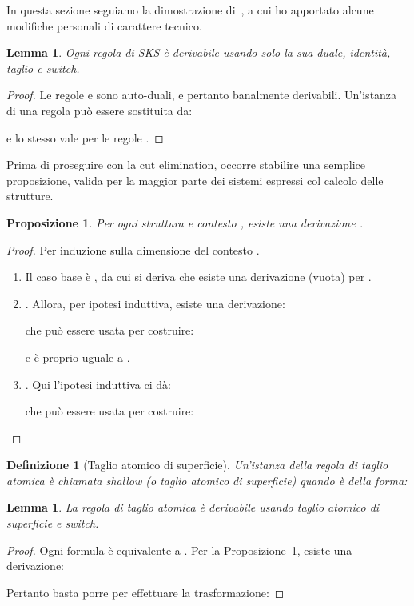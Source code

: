 \documentclass[12pt,a4paper,openright,twoside]{report}
\newtheorem{dfn}[thm]{Definizione}
\newtheorem{lem}[thm]{Lemma}
\newtheorem{prop}[thm]{Proposizione}
\begin{document}
In questa sezione seguiamo la dimostrazione di~\cite{Bru04}, a cui ho apportato alcune modifiche personali di carattere tecnico.

\begin{lem}\label{lem:sks_cut1}
Ogni regola di \textsf{SKS} \`e derivabile usando solo la sua duale, \emph{identit\`a}, \emph{taglio} e \emph{switch}.
\end{lem}
\begin{proof}
Le regole  e  sono auto-duali, e pertanto banalmente derivabili. Un'istanza di una regola  pu\`o essere sostituita da:

e lo stesso vale per le regole .
\end{proof}

Prima di proseguire con la cut elimination, occorre stabilire una semplice proposizione, valida per la maggior parte dei sistemi espressi col calcolo delle strutture.

\begin{prop}\label{prop:sks_ctx_ins}
Per ogni struttura  e contesto , esiste una derivazione .
\end{prop}
\begin{proof}
Per induzione sulla dimensione del contesto .
\begin{enumerate}
	\item Il caso base \`e , da cui si deriva che esiste una derivazione (vuota) per .
	\item . Allora, per ipotesi induttiva, esiste una derivazione: 
	
	che pu\`o essere usata per costruire:
	
	e  \`e proprio uguale a .
	\item . Qui l'ipotesi induttiva ci d\`a:
	
	che pu\`o essere usata per costruire:
	
\end{enumerate}
\end{proof}

\begin{dfn}[Taglio atomico di superficie]
Un'istanza della regola di taglio atomica  \`e chiamata \emph{shallow} (o \emph{taglio atomico di superficie}) quando \`e della forma:

\end{dfn}

\begin{lem}\label{lem:sks_shallow_cut}
La regola di taglio atomica  \`e derivabile usando \emph{taglio atomico di superficie} e \emph{switch}.
\end{lem}
\begin{proof}
Ogni formula  \`e equivalente a . Per la Proposizione~\ref{prop:sks_ctx_ins}, esiste una derivazione:

Pertanto basta porre  per effettuare la trasformazione:

\end{proof}
\end{document}

